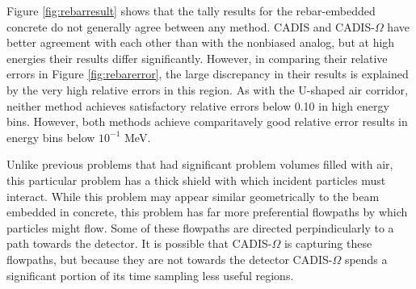 Figure \ref{fig:rebarresult} shows that the tally results for the rebar-embedded
concrete do not generally agree between any method. CADIS and CADIS-$\Omega$
have better agreement with each other than with the nonbiased analog, but at
high energies their results differ significantly. However, in comparing their
relative errors in Figure \ref{fig:rebarerror}, the large discrepancy in their
results is explained by the very high relative errors in this region. As with
the U-shaped air corridor, neither method achieves satisfactory relative errors
below 0.10 in high energy bins. However, both methods achieve comparitavely good
relative error results in energy bins below $10^{-1}$ MeV.

Unlike previous problems that had
significant problem volumes filled with air, this particular problem has a thick
shield with which incident particles must interact. While this problem may
appear similar geometrically to the beam embedded in
concrete, this problem has far more preferential flowpaths by which particles
might flow. Some of these flowpaths are directed perpindicularly to a path
towards the detector. It is possible that CADIS-$\Omega$ is capturing these
flowpaths, but because they are not towards the detector CADIS-$\Omega$ spends a
significant portion of its time sampling less useful regions.


